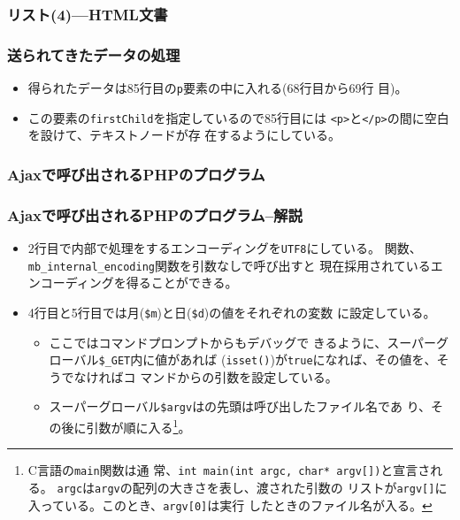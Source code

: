 \begin{frame}[containsverbatim]
\frametitle{リスト(4)---HTML文書}
\end{frame}
\begin{frame}[containsverbatim]
\frametitle{送られてきたデータの処理}
\begin{itemize}
 \item 得られたデータは85行目の\texttt{p}要素の中に入れる(68行目から69行
       目)。
 \item この要素の\texttt{firstChild}を指定しているので85行目には
       \texttt{<p>}と\texttt{</p>}の間に空白を設けて、テキストノードが存
       在するようにしている。
\end{itemize}\end{frame}
\begin{frame}[containsverbatim]
\frametitle{Ajaxで呼び出されるPHPのプログラム}
\end{frame}
\begin{frame}[containsverbatim]
\frametitle{Ajaxで呼び出されるPHPのプログラム--解説}
\begin{itemize}
 \item 2行目で内部で処理をするエンコーディングを\texttt{UTF8}にしている。
       関数、\texttt{mb\_internal\_encoding}関数を引数なしで呼び出すと
       現在採用されているエンコーディングを得ることができる。
 \item 4行目と5行目では月(\verb+$m+)と日(\verb+$d+)の値をそれぞれの変数
       に設定している。
\begin{itemize}
 \item ここではコマンドプロンプトからもデバッグで
       きるように、スーパーグローバル\verb+$_GET+内に値があれば
       (\Verb+isset()+)が\Verb+true+になれば、その値を、そうでなければコ
       マンドからの引数を設定している。
 \item スーパーグローバル\verb+$argv+はの先頭は呼び出したファイル名であ
       り、その後に引数が順に入る\footnote{C言語の\texttt{main}関数は通
       常、\texttt{int main(int argc, char* argv[])}と宣言される。%
       \texttt{argc}は\texttt{argv}の配列の大きさを表し、渡された引数の
       リストが\texttt{argv[]}に入っている。このとき、\texttt{argv[0]}は実行
       したときのファイル名が入る。}。
\end{itemize}
\end{itemize}
\end{frame}
